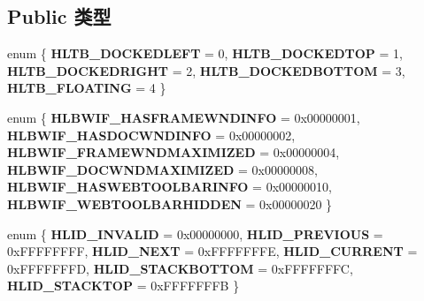\subsection*{Public 类型}
\begin{DoxyCompactItemize}
\item 
\mbox{\label{interface_i_hlink_browse_context_aea021a542c950d063a2756747fd8cf55}} 
enum \{ \newline
{\bfseries H\+L\+T\+B\+\_\+\+D\+O\+C\+K\+E\+D\+L\+E\+FT} = 0, 
{\bfseries H\+L\+T\+B\+\_\+\+D\+O\+C\+K\+E\+D\+T\+OP} = 1, 
{\bfseries H\+L\+T\+B\+\_\+\+D\+O\+C\+K\+E\+D\+R\+I\+G\+HT} = 2, 
{\bfseries H\+L\+T\+B\+\_\+\+D\+O\+C\+K\+E\+D\+B\+O\+T\+T\+OM} = 3, 
\newline
{\bfseries H\+L\+T\+B\+\_\+\+F\+L\+O\+A\+T\+I\+NG} = 4
 \}
\item 
\mbox{\label{interface_i_hlink_browse_context_a5c0c73469d84bef4ff2af94ba1e0cb6b}} 
enum \{ \newline
{\bfseries H\+L\+B\+W\+I\+F\+\_\+\+H\+A\+S\+F\+R\+A\+M\+E\+W\+N\+D\+I\+N\+FO} = 0x00000001, 
{\bfseries H\+L\+B\+W\+I\+F\+\_\+\+H\+A\+S\+D\+O\+C\+W\+N\+D\+I\+N\+FO} = 0x00000002, 
{\bfseries H\+L\+B\+W\+I\+F\+\_\+\+F\+R\+A\+M\+E\+W\+N\+D\+M\+A\+X\+I\+M\+I\+Z\+ED} = 0x00000004, 
{\bfseries H\+L\+B\+W\+I\+F\+\_\+\+D\+O\+C\+W\+N\+D\+M\+A\+X\+I\+M\+I\+Z\+ED} = 0x00000008, 
\newline
{\bfseries H\+L\+B\+W\+I\+F\+\_\+\+H\+A\+S\+W\+E\+B\+T\+O\+O\+L\+B\+A\+R\+I\+N\+FO} = 0x00000010, 
{\bfseries H\+L\+B\+W\+I\+F\+\_\+\+W\+E\+B\+T\+O\+O\+L\+B\+A\+R\+H\+I\+D\+D\+EN} = 0x00000020
 \}
\item 
\mbox{\label{interface_i_hlink_browse_context_aaa6d514bf9e414dcd497c871ba389dd9}} 
enum \{ \newline
{\bfseries H\+L\+I\+D\+\_\+\+I\+N\+V\+A\+L\+ID} = 0x00000000, 
{\bfseries H\+L\+I\+D\+\_\+\+P\+R\+E\+V\+I\+O\+US} = 0x\+F\+F\+F\+F\+F\+F\+FF, 
{\bfseries H\+L\+I\+D\+\_\+\+N\+E\+XT} = 0x\+F\+F\+F\+F\+F\+F\+FE, 
{\bfseries H\+L\+I\+D\+\_\+\+C\+U\+R\+R\+E\+NT} = 0x\+F\+F\+F\+F\+F\+F\+FD, 
\newline
{\bfseries H\+L\+I\+D\+\_\+\+S\+T\+A\+C\+K\+B\+O\+T\+T\+OM} = 0x\+F\+F\+F\+F\+F\+F\+FC, 
{\bfseries H\+L\+I\+D\+\_\+\+S\+T\+A\+C\+K\+T\+OP} = 0x\+F\+F\+F\+F\+F\+F\+FB
 \}
\item 
\mbox{\label{interface_i_hlink_browse_context_a1e01b77cb4bb5ba0969f485fc5753c82}} 

\end{DoxyCompactItemize}
